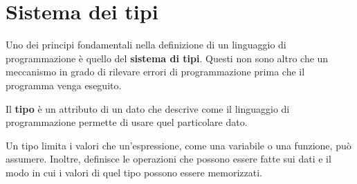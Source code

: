 \section{Sistema dei tipi}
Uno dei principi fondamentali nella definizione di un linguaggio di programmazione è quello del \textbf{sistema di tipi}.
Questi non sono altro che un meccanismo in grado di rilevare errori di programmazione prima che il programma venga eseguito.

Il \textbf{tipo} è un attributo di un dato che descrive come il linguaggio di programmazione permette di usare quel
particolare dato.

Un tipo limita i valori che un'espressione, come una variabile o una funzione, può assumere. Inoltre, definisce le
operazioni che possono essere fatte sui dati e il modo in cui i valori di quel tipo possono essere memorizzati.